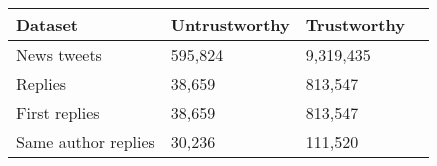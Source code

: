 \begin{tabular}{llll}
\toprule
           Dataset &   Untrustworthy &         Trustworthy  \\
\midrule
     News tweets &  595,824 &    9,319,435 \\
     Replies & 38,659 & 813,547   \\
     First replies & 38,659 &    813,547  \\
     Same author replies &   30,236 & 111,520  \\
\bottomrule
\end{tabular}
